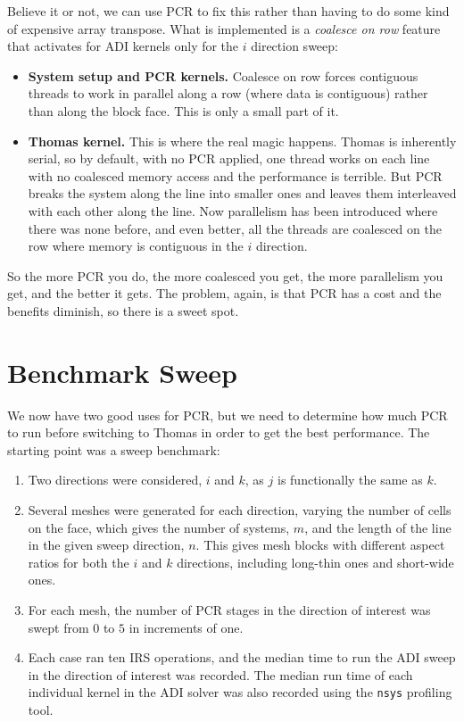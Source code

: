 \documentclass[noinfobox]{mdolab-article}
\newcommand{\code}[1]{\texttt{#1}}
\begin{document}
Believe it or not, we can use PCR to fix this rather than having to do some kind of expensive array transpose.
What is implemented is a \emph{coalesce on row} feature that activates for ADI kernels only for the $i$ direction sweep:

\begin{itemize}[leftmargin=*]
  \item \textbf{System setup and PCR kernels.}
        Coalesce on row forces contiguous threads to work in parallel along a row (where data is contiguous) rather than along the block face.
        This is only a small part of it.
  \item \textbf{Thomas kernel.}
        This is where the real magic happens.
        Thomas is inherently serial, so by default, with no PCR applied, one thread works on each line with no coalesced memory access and the performance is terrible.
        But PCR breaks the system along the line into smaller ones and leaves them interleaved with each other along the line.
        Now parallelism has been introduced where there was none before, and even better, all the threads are coalesced on the row where memory is contiguous in the $i$ direction.
\end{itemize}

So the more PCR you do, the more coalesced you get, the more parallelism you get, and the better it gets.
The problem, again, is that PCR has a cost and the benefits diminish, so there is a sweet spot.

\section{Benchmark Sweep}
\label{sec:benchmark}

We now have two good uses for PCR, but we need to determine how much PCR to run before switching to Thomas in order to get the best performance.
The starting point was a sweep benchmark:

\begin{enumerate}[leftmargin=*]
  \item Two directions were considered, $i$ and $k$, as $j$ is functionally the same as $k$.
  \item Several meshes were generated for each direction, varying the number of cells on the face, which gives the number of systems, $m$, and the length of the line in the given sweep direction, $n$.
        This gives mesh blocks with different aspect ratios for both the $i$ and $k$ directions, including long-thin ones and short-wide ones.
  \item For each mesh, the number of PCR stages in the direction of interest was swept from $0$ to $5$ in increments of one.
  \item Each case ran ten IRS operations, and the median time to run the ADI sweep in the direction of interest was recorded.
        The median run time of each individual kernel in the ADI solver was also recorded using the \code{nsys} profiling tool.
\end{enumerate}
\end{document}
